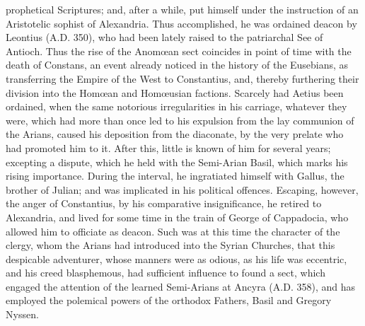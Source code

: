 prophetical Scriptures; and, after a while, put himself under the
instruction of an Aristotelic sophist of Alexandria. Thus
accomplished, he was ordained deacon by Leontius (A.D.
350), who had been lately raised to the patriarchal See of Antioch.
Thus the rise of the Anomœan sect coincides in point of time with the
death of Constans, an event already noticed in the history of the
Eusebians, as transferring the Empire of the West to Constantius, and,
thereby furthering their division into the Homœan and Homœusian
factions. Scarcely had Aetius been ordained, when the same notorious
irregularities in his carriage, whatever they were, which had more
than once led to his expulsion from the lay communion of the Arians,
caused his deposition from the diaconate, by the very prelate
who had promoted him to it. After this, little is known of him for
several years; excepting a dispute, which he held with the Semi-Arian
Basil, which marks his rising importance. During the interval, he
ingratiated himself with Gallus, the brother of Julian; and was
implicated in his political offences. Escaping, however, the anger of
Constantius, by his comparative insignificance, he retired to
Alexandria, and lived for some time in the train of George of
Cappadocia, who allowed him to officiate as deacon. Such was at this
time the character of the clergy, whom the Arians had introduced into
the Syrian Churches, that this despicable adventurer, whose manners
were as odious, as his life was eccentric, and his creed blasphemous,
had sufficient influence to found a sect, which engaged the attention
of the learned Semi-Arians at Ancyra (A.D. 358),
and has employed the polemical powers of the orthodox Fathers, Basil
and Gregory Nyssen.

